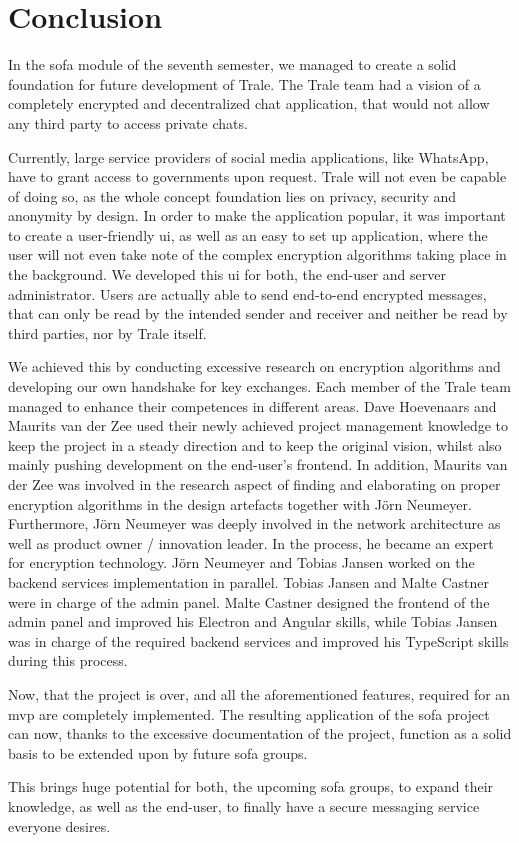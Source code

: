 \chapter{Conclusion}\label{ch:conclusion}
In the \ac{sofa} module of the seventh semester, we managed to create a solid foundation for future development of
Trale.
The Trale team had a vision of a completely encrypted and decentralized chat application, that would not allow any
third party to access private chats.

Currently, large service providers of social media applications, like WhatsApp, have to grant access to governments upon
request.
Trale will not even be capable of doing so, as the whole concept foundation lies on privacy, security and anonymity by
design.
In order to make the application popular, it was important to create a user-friendly \ac{ui}, as well as an easy to set
up application, where the user will not even take note of the complex encryption algorithms taking place in the
background.
We developed this \ac{ui} for both, the end-user and server administrator.
Users are actually able to send end-to-end encrypted messages, that can only be read by the intended sender and receiver
and neither be read by third parties, nor by Trale itself.

We achieved this by conducting excessive research on encryption algorithms and developing our own handshake for key
exchanges.
Each member of the Trale team managed to enhance their competences in different areas.
Dave Hoevenaars and Maurits van der Zee used their newly achieved project management knowledge to keep the project in
a steady direction and to keep the original vision, whilst also mainly pushing development on the end-user's frontend.
In addition, Maurits van der Zee was involved in the research aspect of finding and elaborating on proper encryption
algorithms in the design artefacts together with J\"orn Neumeyer.
Furthermore, J\"orn Neumeyer was deeply involved in the network architecture as well as product owner / innovation
leader.
In the process, he became an expert for encryption technology.
J\"orn Neumeyer and Tobias Jansen worked on the backend services implementation in parallel.
Tobias Jansen and Malte Castner were in charge of the admin panel.
Malte Castner designed the frontend of the admin panel and improved his Electron and Angular skills, while Tobias
Jansen was in charge of the required backend services and improved his TypeScript skills during this process.

Now, that the project is over, and all the aforementioned features, required for an \ac{mvp} are completely
implemented.
The resulting application of the \ac{sofa} project can now, thanks to the excessive documentation of the project,
function as a solid basis to be extended upon by future \ac{sofa} groups.

This brings huge potential for both, the upcoming \ac{sofa} groups, to expand their knowledge, as well as the end-user,
to finally have a secure messaging service everyone desires.
